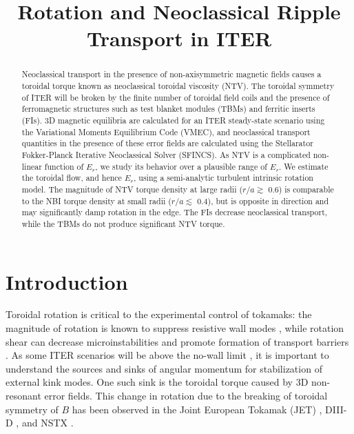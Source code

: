 \documentclass{article}
\numberwithin{figure}{section}
\numberwithin{equation}{section}
\begin{document}
\title{Rotation and Neoclassical Ripple Transport in ITER}

\maketitle

\begin{abstract}

Neoclassical transport in the presence of non-axisymmetric magnetic fields causes a toroidal torque known as neoclassical toroidal viscosity (NTV). The toroidal symmetry of ITER will be broken by the finite number of toroidal field coils and the presence of ferromagnetic structures such as test blanket modules (TBMs) and ferritic inserts (FIs). 3D magnetic equilibria are calculated for an ITER steady-state scenario using the Variational Moments Equilibrium Code (VMEC), and neoclassical transport quantities in the presence of these error fields are calculated using the Stellarator Fokker-Planck Iterative Neoclassical Solver (SFINCS). As NTV is a complicated non-linear function of $E_r$, we study its behavior over a plausible range of $E_r$. We estimate the toroidal flow, and hence $E_r$, using a semi-analytic turbulent intrinsic rotation model. The magnitude of NTV torque density at large radii ($r/a \gtrsim$ 0.6) is comparable to the NBI torque density at small radii ($r/a \lesssim$ 0.4), but is opposite in direction and may significantly damp rotation in the edge. The FIs decrease neoclassical transport, while the TBMs do not produce significant NTV torque. 
\end{abstract}

\section{Introduction}

Toroidal rotation is critical to the experimental control of tokamaks: the magnitude of rotation is known to suppress resistive wall modes \cite{Bondeson1994, Garofalo2002}, while rotation shear can decrease microinstabilities and promote formation of transport barriers \cite{Burrell1997, Terry2000}. As some ITER scenarios will be above the no-wall limit \cite{Liu2004}, it is important to understand the sources and sinks of angular momentum for stabilization of external kink modes. One such sink is the toroidal torque caused by 3D non-resonant error fields. This change in rotation due to the breaking of toroidal symmetry of $B$ has been observed in the Joint European Tokamak (JET) \cite{Lazzaro2002, DeVries2008}, DIII-D \cite{Garofalo2008}, and NSTX \cite{Zhu2006}. 
\end{document}

